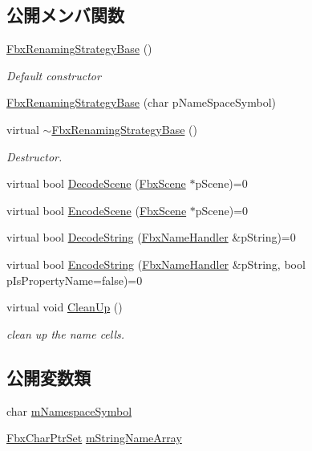 \subsection*{公開メンバ関数}
\begin{DoxyCompactItemize}
\item 
\hyperlink{class_fbx_renaming_strategy_base_a96b05d890a49769ed329ffb79c052a54}{Fbx\+Renaming\+Strategy\+Base} ()
\begin{DoxyCompactList}\small\item\em Default constructor \end{DoxyCompactList}\item 
\hyperlink{class_fbx_renaming_strategy_base_a236910482755c3d7e0ee9d28d3b74a31}{Fbx\+Renaming\+Strategy\+Base} (char p\+Name\+Space\+Symbol)
\item 
virtual \hyperlink{class_fbx_renaming_strategy_base_a9c79c9c02fef4d3480bd7a4704fd2019}{$\sim$\+Fbx\+Renaming\+Strategy\+Base} ()
\begin{DoxyCompactList}\small\item\em Destructor. \end{DoxyCompactList}\item 
virtual bool \hyperlink{class_fbx_renaming_strategy_base_a6c368dff1424b4b54cdfa49ad49bf09c}{Decode\+Scene} (\hyperlink{class_fbx_scene}{Fbx\+Scene} $\ast$p\+Scene)=0
\item 
virtual bool \hyperlink{class_fbx_renaming_strategy_base_a7449fa6c649949d6d5e3c4b7190d6b25}{Encode\+Scene} (\hyperlink{class_fbx_scene}{Fbx\+Scene} $\ast$p\+Scene)=0
\item 
virtual bool \hyperlink{class_fbx_renaming_strategy_base_acc30037744da35fa2b59fdd4ff6d9ede}{Decode\+String} (\hyperlink{class_fbx_name_handler}{Fbx\+Name\+Handler} \&p\+String)=0
\item 
virtual bool \hyperlink{class_fbx_renaming_strategy_base_aa762726a9d92a328ec720f2b8135db09}{Encode\+String} (\hyperlink{class_fbx_name_handler}{Fbx\+Name\+Handler} \&p\+String, bool p\+Is\+Property\+Name=false)=0
\item 
virtual void \hyperlink{class_fbx_renaming_strategy_base_ae1ab8784f6769fce3068ee21e3c34196}{Clean\+Up} ()
\begin{DoxyCompactList}\small\item\em clean up the name cells. \end{DoxyCompactList}\end{DoxyCompactItemize}
\subsection*{公開変数類}
\begin{DoxyCompactItemize}
\item 
char \hyperlink{class_fbx_renaming_strategy_base_a9952264301fae41f0ecbc63bcaf1e7fa}{m\+Namespace\+Symbol}
\item 
\hyperlink{class_fbx_char_ptr_set}{Fbx\+Char\+Ptr\+Set} \hyperlink{class_fbx_renaming_strategy_base_a4cab3a7e42cbd982adc44841c38b02d0}{m\+String\+Name\+Array}
\end{DoxyCompactItemize}


